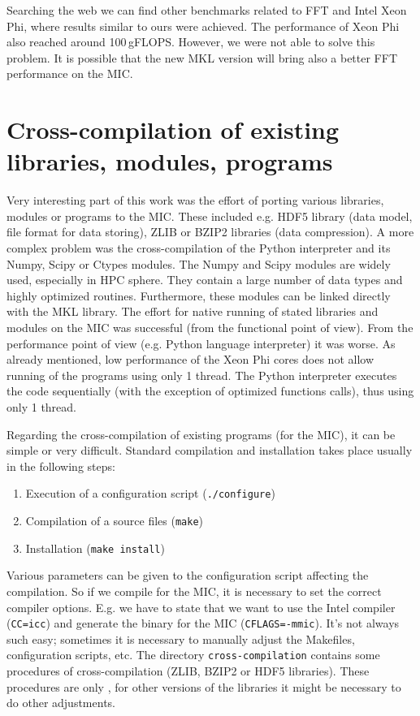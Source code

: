 \par Searching the web we can find other benchmarks related to FFT and Intel Xeon Phi, where results similar to ours were achieved. The performance of Xeon Phi also reached around 100\,gFLOPS. However, we were not able to solve this problem. It is possible that the new MKL version will bring also a better FFT performance on the MIC.

\section{Cross-compilation of existing libraries, modules, programs}
\label{sec:crosscompilation}
Very interesting part of this work was the effort of porting various libraries, modules or programs to the MIC. These included e.g. HDF5 library (data model, file format for data storing), ZLIB or BZIP2 libraries (data compression). A more complex problem was the cross-compilation of the Python interpreter and its Numpy, Scipy or Ctypes modules. The Numpy and Scipy modules are widely used, especially in HPC sphere. They contain a large number of data types and highly optimized routines. Furthermore, these modules can be linked directly with the MKL library. The effort for native running of stated libraries and modules on the MIC was successful (from the functional point of view). From the performance point of view (e.g. Python language interpreter) it was worse. As already mentioned, low performance of the Xeon Phi cores does not allow  running of the programs using only 1 thread. The Python interpreter executes the code sequentially (with the exception of optimized functions calls), thus using only 1 thread.

\par Regarding the cross-compilation of existing programs (for the MIC), it can be simple or very difficult. Standard compilation and installation takes place usually in the following steps:

\begin{enumerate}
\item{Execution of a configuration script (\texttt{./configure})} 
\item{Compilation of a source files (\texttt{make})}
\item{Installation (\texttt{make install})}
\end{enumerate}

Various parameters can be given to the configuration script affecting the compilation. So if we compile for the MIC, it is necessary to set the correct compiler options. E.g. we have to state that we want to use the Intel compiler (\texttt{CC=icc}) and generate the binary for the MIC (\texttt{CFLAGS=-mmic}). It's not always such easy; sometimes it is necessary to manually adjust the Makefiles, configuration scripts, etc. The directory \texttt{cross-compilation} contains some procedures of cross-compilation (ZLIB, BZIP2 or HDF5 libraries). These procedures are only , for other versions of the libraries it might be necessary to do other adjustments.

